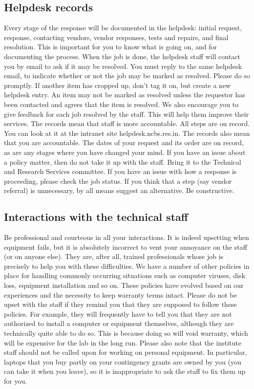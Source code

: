 \documentclass[a4paper,10pt]{article}
\begin{document}
\subsection{Helpdesk records}
Every stage of the response will be documented in the helpdesk: initial
request, response, contacting vendors, vendor responses, tests and repairs, and final
resolution. This is important for you to know what is going on, and for documenting the
process. When the job is done, the helpdesk staff will contact you by email to ask if it may
be resolved. You must reply to the same helpdesk email, to indicate whether or not the job
may be marked as resolved. Please do so promptly. If another item has cropped up, don’t tag
it on, but create a new helpdesk entry. An item may not be marked as resolved unless the
requestor has been contacted and agrees that the item is resolved. We also encourage you to
give feedback for each job resolved by the staff. This will help them improve their services.
The records mean that staff is more accountable. All steps are on record. You can look at it
at the intranet site helpdesk.ncbs.res.in. The records also mean that you are accountable. The
dates of your request and its order are on record, as are any stages where you have changed
your mind. If you have an issue about a policy matter, then do not take it up with the staff.
Bring it to the Technical and Research Services committee. If you have an issue with how a
response is proceeding, please check the job status. If you think that a step (say vendor
referral) is unnecessary, by all means suggest an alternative. Be constructive.

\subsection{Interactions with the technical staff}
Be professional and courteous in all your
interactions. It is indeed upsetting when equipment fails, but it is absolutely incorrect to vent
your annoyance on the staff (or on anyone else). They are, after all, trained professionals
whose job is precisely to help you with these difficulties. We have a number of other
policies in place for handling commonly occurring situations such as computer viruses, disk
loss, equipment installation and so on. These policies have evolved based on our
experiences and the necessity to keep warranty terms intact. Please do not be upset with the
staff if they remind you that they are supposed to follow these policies. For example, they
will frequently have to tell you that they are not authorized to install a computer or
equipment themselves, although they are technically quite able to do so. This is because
doing so will void warranty, which will be expensive for the lab in the long run. Please also
note that the institute staff should not be called upon for working on personal equipment. In
particular, laptops that you buy partly on your contingency grants are owned by you (you
can take it when you leave), so it is inappropriate to ask the staff to fix them up for you.
\end{document}

